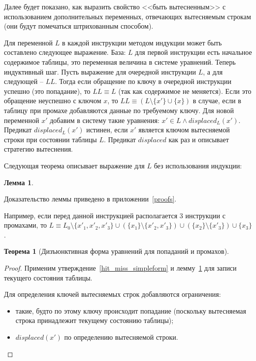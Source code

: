 \documentclass[14pt]{extreport}
\newtheorem{theorem}{Теорема}
\newtheorem{lemma}{Лемма}
\begin{document}
Далее будет показано, как выразить свойство <<быть вытесненным>> с
использованием дополнительных переменных, отвечающих вытесняемым строкам (они
будут помечаться штрихованным способом).

Для переменной $L$ в каждой инструкции методом индукции может быть
составлено следующее выражение. База: $L$ для первой инструкции есть
начальное содержимое таблицы, это переменная величина в
системе уравнений. Теперь индуктивный шаг. Пусть выражение для
очередной инструкции $L$, а для следующей -- $LL$. Тогда если
обращение по ключу в очередной инструкции успешно (это попадание), то $LL
\equiv L$ (так как содержимое не меняется). Если это обращение неуспешно с
ключом $x$, то $LL \equiv (L \setminus \{x'\} \cup \{x\})$ в случае, если
в таблицу при промахе добавляются данные по требуемому ключу.
Для новой переменной $x'$ добавим в систему такие уравнения: $x' \in
L \wedge displaced_L(x')$. Предикат $displaced_L(x')$ истинен, если $x'$
является ключом вытесняемой строки при состоянии таблицы $L$. Предикат
$displaced$ как раз и описывает
стратегию вытеснения.

Следующая теорема описывает выражение для $L$ без использования
индукции:
\begin{lemma}\label{L_current} \LcurrentBody
\end{lemma}
Доказательство леммы приведено в приложении~\ref{proofs}.

Например, если перед данной инструкцией располагается 3 инструкции с
промахами, то $L \equiv L_0 \setminus \{x'_1, x'_2, x'_3\} \cup
(\{x_1\} \setminus \{x'_2, x'_3\}) \cup (\{x_2\} \setminus \{x'_3\})
\cup \{x_3\}$.

\begin{theorem}[Дизъюнктивная форма уравнений для попаданий и
промахов]\label{hit_miss_equations} \HitMissEquations
\end{theorem}
\begin{proof}
Применим утверждение~\ref{hit_miss_simpleform} и лемму~\ref{L_current} для
записи текущего
состояния таблицы.

Для определения ключей вытесняемых строк добавляются ограничения:
\begin{itemize}
    \item такие, будто по этому ключу происходит попадание (поскольку
вытесняемая строка
принадлежит текущему состоянию таблицы);
    \item $displaced(x')$ по определению вытесняемой строки.
\end{itemize}
\end{proof}
\end{document}
